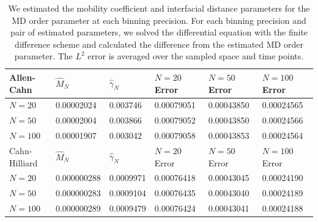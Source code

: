 \documentclass[12pt, reqno]{report}
\theoremstyle{definition}
\theoremstyle{remark}
\begin{document}
\begin{table}[H]

    \centering
    \begin{tabular}{|l|l|l|l|l|l|}
        \hline
        Allen-Cahn        & $\hat M_N$ & $\hat \gamma_N$ & $N=20$ Error & $N=50$ Error & $N=100$ Error \\ \hline
        $N=20$  & 0.00002024 & 0.003746        & 0.00079051   & 0.00043850   & 0.00024565    \\ \hline
        $N=50$  & 0.00002004 & 0.003866        & 0.00079052   & 0.00043850   & 0.00024566    \\ \hline
        $N=100$ & 0.00001907 & 0.003042        & 0.00079058   & 0.00043853   & 0.00024564    \\ \hline
        
        \hline
        \hline
        Cahn-Hilliard        & $\hat M_N$  & $\hat \gamma_N$ & $N=20$ Error & $N=50$ Error & $N=100$ Error \\ \hline
        $N=20$  & 0.000000288 & 0.0009971       & 0.00076418   & 0.00043045   & 0.00024190    \\ \hline
        $N=50$  & 0.000000283 & 0.0009104       & 0.00076435   & 0.00043040   & 0.00024189    \\ \hline
        $N=100$ & 0.000000289 & 0.0009479       & 0.00076424   & 0.00043041   & 0.00024188    \\ \hline
    \end{tabular}


    
    \caption{We estimated the mobility coefficient and interfacial distance parameters for the MD order parameter at each binning precision.
    For each binning precision and pair of estimated parameters, we solved the differential equation with the finite difference scheme and calculated the difference from the estimated MD order parameter.
    The $L^2$ error is averaged over the sampled space and time points.}
    \label{tb_phase_data}
\end{table}


\end{document}
